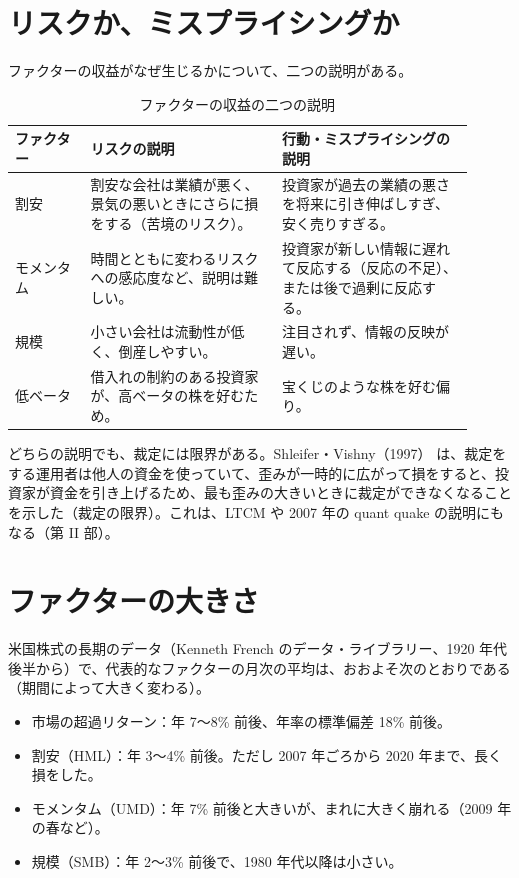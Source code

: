 \section{リスクか、ミスプライシングか}

ファクターの収益がなぜ生じるかについて、二つの説明がある。

\begin{table}[H]
\centering\small
\caption{ファクターの収益の二つの説明}
\label{tab:riskmisp}
\begin{tabular}{@{}P{0.15\linewidth}P{0.38\linewidth}P{0.38\linewidth}@{}}
\toprule
ファクター & リスクの説明 & 行動・ミスプライシングの説明 \\
\midrule
割安 & 割安な会社は業績が悪く、景気の悪いときにさらに損をする（苦境のリスク）。 & 投資家が過去の業績の悪さを将来に引き伸ばしすぎ、安く売りすぎる。 \\
モメンタム & 時間とともに変わるリスクへの感応度など、説明は難しい。 & 投資家が新しい情報に遅れて反応する（反応の不足）、または後で過剰に反応する。 \\
規模 & 小さい会社は流動性が低く、倒産しやすい。 & 注目されず、情報の反映が遅い。 \\
低ベータ & 借入れの制約のある投資家が、高ベータの株を好むため。 & 宝くじのような株を好む偏り。 \\
\bottomrule
\end{tabular}
\end{table}

どちらの説明でも、裁定には限界がある。Shleifer・Vishny（1997）\cite{shleifer1997} は、裁定をする運用者は他人の資金を使っていて、歪みが一時的に広がって損をすると、投資家が資金を引き上げるため、最も歪みの大きいときに裁定ができなくなることを示した（裁定の限界）。これは、LTCM や 2007 年の quant quake の説明にもなる（第 II 部）。

\section{ファクターの大きさ}

米国株式の長期のデータ（Kenneth French のデータ・ライブラリー、1920 年代後半から）で、代表的なファクターの月次の平均は、おおよそ次のとおりである（期間によって大きく変わる）。

\begin{itemize}
\item 市場の超過リターン：年 7〜8\% 前後、年率の標準偏差 18\% 前後。
\item 割安（HML）：年 3〜4\% 前後。ただし 2007 年ごろから 2020 年まで、長く損をした。
\item モメンタム（UMD）：年 7\% 前後と大きいが、まれに大きく崩れる（2009 年の春など）。
\item 規模（SMB）：年 2〜3\% 前後で、1980 年代以降は小さい。
\end{itemize}

